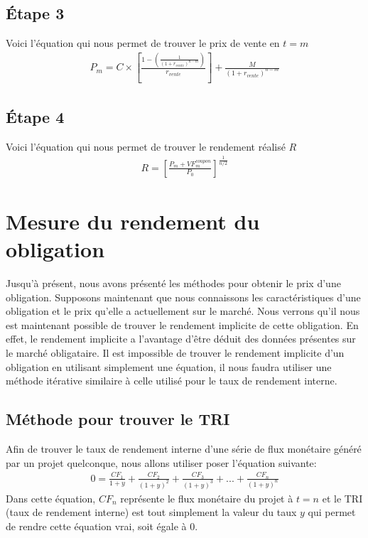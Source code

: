 \documentclass[12pt]{article}
\begin{document}
\subsection{Étape 3}
Voici l'équation qui nous permet de trouver le prix de vente en $t=m$
\begin{align*}
P_m=C \times \left[\frac{1-\left( \frac{1}{(1+r_{vente})^{n-m}}\right)}{r_{vente}} \right] +\frac{M}{(1+r_{vente})^{n-m}}
\end{align*}
\subsection{Étape 4}
Voici l'équation qui nous permet de trouver le rendement réalisé $R$
\begin{align*}
R=\left[\frac{P_m+VF_m^{coupon}}{P_0} \right]^{\frac{1}{n/2}}
\end{align*}
\section{Mesure du rendement du obligation}
Jusqu'à présent, nous avons présenté les méthodes pour obtenir le prix d'une obligation. Supposons maintenant que nous connaissons les caractéristiques d'une obligation et le prix qu'elle a actuellement sur le marché. Nous verrons qu'il nous est maintenant possible de trouver le rendement implicite de cette obligation. En effet, le rendement implicite a l'avantage d'être déduit des données présentes sur le marché obligataire. Il est impossible de trouver le rendement implicite d'un obligation en utilisant simplement une équation, il nous faudra utiliser une méthode itérative similaire à celle utilisé pour le taux de rendement interne.

\subsection{Méthode pour trouver le TRI}
Afin de trouver le taux de rendement interne d'une série de flux monétaire généré par un projet quelconque, nous allons utiliser poser l'équation suivante:
\begin{align*}
0=\frac{CF_1}{1+y}+\frac{CF_2}{(1+y)^2}+\frac{CF_3}{(1+y)^3}+...+\frac{CF_n}{(1+y)^n}
\end{align*}
Dans cette équation, $CF_n$ représente le flux monétaire du projet à $t=n$ et le TRI (taux de rendement interne) est tout simplement la valeur du taux $y$ qui permet de rendre cette équation vrai, soit égale à 0.
\end{document}
